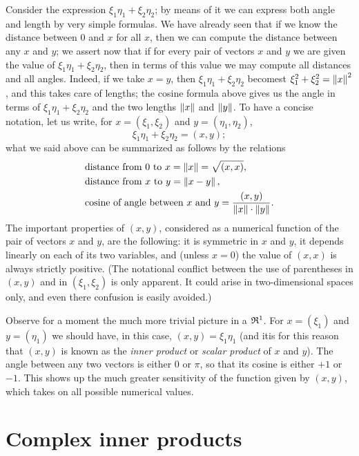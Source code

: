 Consider the expression \(\xi_1\eta_1 + \xi_2\eta_2\); by means of it we can
express both angle and length by very simple formulas. We have already seen that
if we know the distance between \(0\) and \(x\) for all \(x\), then we can
compute the distance between any \(x\) and \(y\); we assert now that if for
every pair of vectors \(x\) and \(y\) we are given the value of \(\xi_1\eta_1 +
\xi_2\eta_2\), then in terms of this value we may compute all distances and all
angles. Indeed, if we take \(x = y\), then \(\xi_1\eta_1 + \xi_2\eta_2\)
becomest \(\xi_1^2 + \xi_2^2 = \left\lVert x\right\rVert^2\), and this takes care of lengths; the
cosine formula above gives us the angle in terms of \(\xi_1\eta_1 +
\xi_2\eta_2\) and the two lengths \(\left\lVert x\right\rVert\) and \(\left\lVert y\right\rVert\). To have a
concise notation, let us write, for \(x = (\xi_1, \xi_2)\) and \(y = (\eta_1,
\eta_2)\),
\begin{equation*}
    \xi_1\eta_1 + \xi_2\eta_2 = (x, y);
\end{equation*}
what we said above can be summarized as follows by the relations
\begin{align*}
    &\text{distance from } 0 \text{ to } x = \left\lVert x\right\rVert = \sqrt{(x, x)}, \\
    &\text{distance from } x \text{ to } y = \left\lVert x-y\right\rVert, \\
    &\text{cosine of angle between } x \text{ and } y = \frac{(x, y)}{\left\lVert x\right\rVert\cdot\left\lVert y\right\rVert}.
\end{align*}
The important properties of \((x, y)\), considered as a numerical function of the
pair of vectors \(x\) and \(y\), are the following: it is symmetric in \(x\) and
\(y\), it depends linearly on each of its two variables, and (unless \(x = 0\))
the value of \((x, x)\) is always strictly positive. (The notational conflict
between the use of parentheses in \((x, y)\) and in \((\xi_1, \xi_2)\) is only
apparent. It could arise in two-dimensional spaces only, and even there
confusion is easily avoided.)

Observe for a moment the much more trivial picture in a \(\mathfrak{R}^1\). For \(x =
(\xi_1)\) and \(y= (\eta_1)\) we should have, in this case, \((x, y) =
\xi_1\eta_1\) (and itis for this reason that \((x, y)\) is known as the
\emph{inner product} or \emph{scalar product} of \(x\) and \(y\)). The angle
between any two vectors is either \(0\) or \(\pi\), so that its cosine is either
\(+1\) or \(-1\). This shows up the much greater sensitivity of the function
given by \((x, y)\), which takes on all possible numerical values.

\section{Complex inner products}

